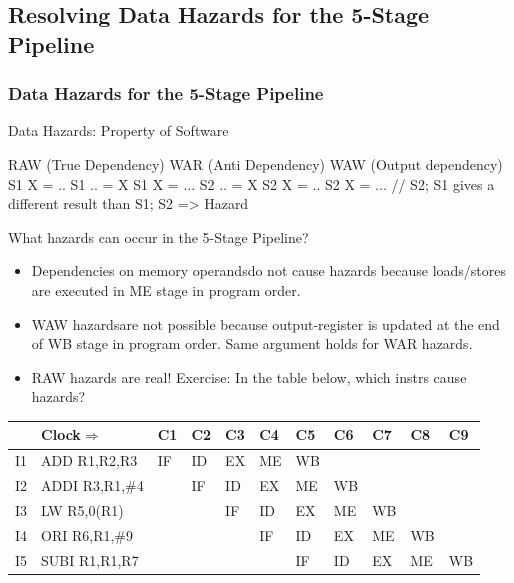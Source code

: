 \documentclass{beamer}
\renewcommand{\emph}[1]{\textcolor{structure}{#1}}
\newcommand{\emp}[1]{\textcolor{DikuRed}{ #1}}
\begin{document}
\subsection{Resolving Data Hazards for the 5-Stage Pipeline}

\begin{frame}[fragile,t]
\frametitle{Data Hazards for the 5-Stage Pipeline}

\begin{block}{Data Hazards: Property of Software}
\begin{colorcode}
RAW (True Dependency)    WAR (Anti Dependency)    WAW (Output dependency)
S1    X  = ..            S1    .. = X             S1    X = ...            
S2    .. = X             S2    X  = ..            S2    X = ...
// S2; S1 gives a different result than S1; S2 => Hazard
\end{colorcode}
\end{block} 
\bigskip
\begin{scriptsize}
What hazards can occur in the 5-Stage Pipeline?
\begin{itemize}
\item \emph{Dependencies on memory operands}\pause do not cause hazards 
        because loads/stores are executed in ME stage in program order.\smallskip
\item \emph{WAW hazards}\pause are not possible because output-register is updated
        at the end of WB stage in program order. Same argument
        holds for \emph{WAR hazards}.\smallskip
\item \alert{RAW hazards are real!} Exercise: In the table below, which instrs cause hazards?
\end{itemize}
\end{scriptsize}
\bigskip
\begin{scriptsize}
\begin{tabular}{lllllllllll}
\hline
   & Clock$\Rightarrow$ & C1 & C2 & C3 & C4 & C5 & C6 & C7 & C8 & C9 \\\hline
I1 & ADD  R1,R2,R3      & IF & ID & EX & ME & \emp{WB} &    &    &    &    \\
I2 & ADDI R3,R1,\#4     &    & IF & ID & EX & ME & WB &    &    &    \\
I3 & LW   R5,0(R1)      &    &    & IF & ID & EX & ME & WB &    &    \\
I4 & ORI  R6,R1,\#9     &    &    &    & IF & ID & EX & ME & WB &    \\
I5 & SUBI R1,R1,R7      &    &    &    &    & IF & ID & EX & ME & WB \\\hline
\end{tabular}
\end{scriptsize} 

\end{frame}
\end{document}
